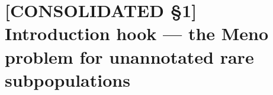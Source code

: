 %
%
%

\section*{[CONSOLIDATED §1] Introduction hook --- the Meno problem for unannotated rare subpopulations}
\label{philo:intro_hook}

